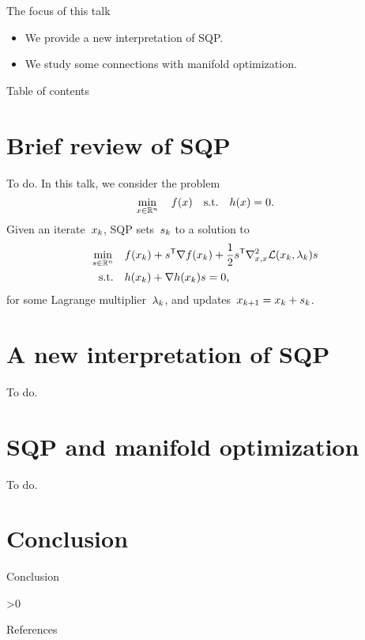 \documentclass[
]{talk}
\newcommand*{\ceq}{h}
\newcommand*{\iter}[1][]{x\ifblank{#1}{}{_{#1}}}
\newcommand*{\lag}{\mathcal{L}}
\newcommand*{\lm}[1][]{\lambda\ifblank{#1}{}{_{#1}}}
\newcommand*{\obj}{f}
\newcommand*{\step}[1][]{s\ifblank{#1}{}{_{#1}}}
\begin{document}
\begin{frame}{The focus of this talk}
    \begin{block}{}
        \begin{itemize}
            \item We provide a new \alert{interpretation} of SQP.
            \item We study some connections with \alert{manifold optimization}.
        \end{itemize}
    \end{block}
\end{frame}

\begin{frame}{Table of contents}
    \tableofcontents[hideallsubsections]
\end{frame}

\section{Brief review of SQP}

\begin{frame}{To do.}
    In this talk, we consider the problem
    \begin{equation*}
        \min_{\iter \in \R^n} \quad \obj(\iter) \quad \text{s.t.} \quad \ceq(\iter) = 0.
    \end{equation*}
    Given an iterate~$\iter[k]$, SQP sets~$\step[k]$ to a solution to
    \begin{equation*}
        \begin{aligned}
            \min_{\step \in \R^n}   & \quad \obj(\iter[k]) + \step^{\T} \nabla \obj(\iter[k]) + \frac{1}{2} \step^{\T} \nabla_{\iter, \iter}^2 \lag(\iter[k], \lm[k]) \step\\
            \text{s.t.}             & \quad \ceq(\iter[k]) + \nabla \ceq(\iter[k]) \step = 0,
        \end{aligned}
    \end{equation*}
    for some Lagrange multiplier~$\lm[k]$, and updates~$\iter[k + 1] = \iter[k] + \step[k]$.
\end{frame}

\section{A new interpretation of SQP}

\begin{frame}{To do.}
\end{frame}

\section{SQP and manifold optimization}

\begin{frame}{To do.}
\end{frame}

\section{Conclusion}

\begin{frame}{Conclusion}
\end{frame}


\appendix
\ifnum\value{cite}>0
    \begin{frame}[t,allowframebreaks]{References}
        
        
    \end{frame}
\fi
\end{document}

